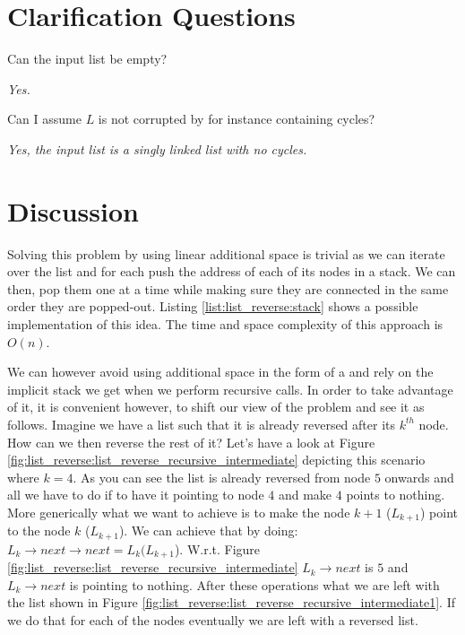 

\section{Clarification Questions}

\begin{QandA}
	\item Can the input list be empty? 
	\begin{answered}
		\textit{Yes.}
	\end{answered}

	\item Can I assume $L$ is not corrupted by for instance containing cycles? 
	\begin{answered}
		\textit{Yes, the input list is a singly linked list with no cycles.}
	\end{answered}
	
\end{QandA}

\section{Discussion}
\label{list_reverse:sec:discussion}
Solving this problem by using linear additional space is  trivial as we can iterate over the list
and for each push the address of each of its nodes in a stack. We can then, pop them one at a time
while making sure they are connected in the same order they are popped-out. Listing
\ref{list:list_reverse:stack} shows a possible implementation of this idea. The time and space
complexity of this approach is $O(n)$.



We can however avoid using additional space in the form of a  and rely on the
implicit stack we get when we perform recursive calls. In order to take advantage of it, it is
convenient however, to shift our view of the problem and see it as follows. Imagine we have a list
such that it is already reversed after its $k^{th}$ node. How can we then reverse the rest of it?
Let's have a look at Figure \ref{fig:list_reverse:list_reverse_recursive_intermediate} depicting
this scenario where $k=4$. As you can see the list is already reversed from node $5$ onwards and all
we have to do if to have it pointing to node $4$ and make $4$ points to nothing. More generically
what we want to achieve is to make the node $k+1$ ($L_{k+1}$) point to the node $k$ ($L_{k+1}$). We
can achieve that by doing: $L_{k} \rightarrow next \rightarrow next= L_{k}(L_{k+1}$). W.r.t. Figure
\ref{fig:list_reverse:list_reverse_recursive_intermediate} $L_{k} \rightarrow next$ is $5$ and
$L_{k} \rightarrow next$ is pointing to nothing. After these operations what we are left with the
list  shown in Figure \ref{fig:list_reverse:list_reverse_recursive_intermediate1}. If we do that for
each of the nodes eventually we are left with a reversed list. 


